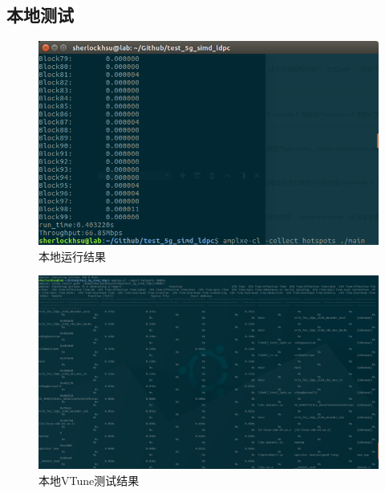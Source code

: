\documentclass{article}
\begin{document}
\subsection{本地测试}
\begin{figure}[H]
	\centering
	\includegraphics[width = .8\textwidth]{resl.png}
	\caption{本地运行结果}
\end{figure}
\begin{figure}[H]
	\centering
	\includegraphics[width = \textwidth]{vtunel.png}
	\caption{本地VTune测试结果}
\end{figure}
\end{document}
